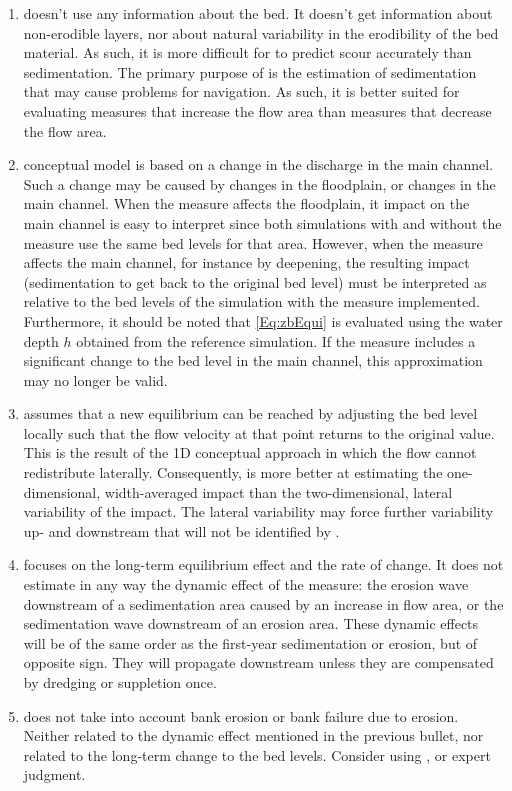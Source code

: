 \begin{enumerate}
\item \dfastmi doesn't use any information about the bed.
It doesn't get information about non-erodible layers, nor about natural variability in the erodibility of the bed material.
As such, it is more difficult for \dfmi to predict scour accurately than sedimentation.
The primary purpose of \dfmi is the estimation of sedimentation that may cause problems for navigation.
As such, it is better suited for evaluating measures that increase the flow area than measures that decrease the flow area.

\item \dfastmi conceptual model is based on a change in the discharge in the main channel.
Such a change may be caused by changes in the floodplain, or changes in the main channel.
When the measure affects the floodplain, it impact on the main channel is easy to interpret since both simulations with and without the measure use the same bed levels for that area.
However, when the measure affects the main channel, for instance by deepening, the resulting impact (sedimentation to get back to the original bed level) must be interpreted as relative to the bed levels of the simulation with the measure implemented.
Furthermore, it should be noted that \autoref{Eq:zbEqui} is evaluated using the water depth $h$ obtained from the reference simulation.
If the measure includes a significant change to the bed level in the main channel, this approximation may no longer be valid.

\item \dfastmi assumes that a new equilibrium can be reached by adjusting the bed level locally such that the flow velocity at that point returns to the original value.
This is the result of the 1D conceptual approach in which the flow cannot redistribute laterally.
Consequently, \dfmi is more better at estimating the one-dimensional, width-averaged impact than the two-dimensional, lateral variability of the impact.
The lateral variability may force further variability up- and downstream that will not be identified by \dfmi.

\item \dfastmi focuses on the long-term equilibrium effect and the rate of change.
It does not estimate in any way the dynamic effect of the measure: the erosion wave downstream of a sedimentation area caused by an increase in flow area, or the sedimentation wave downstream of an erosion area.
These dynamic effects will be of the same order as the first-year sedimentation or erosion, but of opposite sign.
They will propagate downstream unless they are compensated by dredging or suppletion once.

\item \dfastmi does not take into account bank erosion or bank failure due to erosion.
Neither related to the dynamic effect mentioned in the previous bullet, nor related to the long-term change to the bed levels.
Consider using \dfastbe, or expert judgment.

\end{enumerate}
